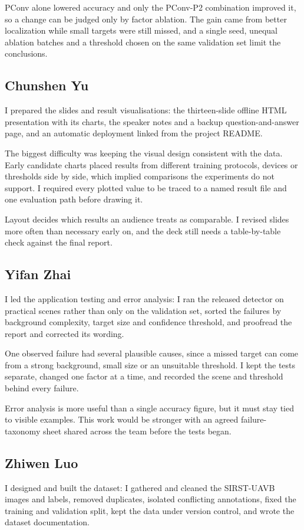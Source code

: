 \documentclass[lettersize,journal]{IEEEtran}
\begin{document}
PConv alone lowered accuracy and only the PConv-P2 combination improved it, so a change can be judged only by factor ablation. The gain came from better localization while small targets were still missed, and a single seed, unequal ablation batches and a threshold chosen on the same validation set limit the conclusions.

\subsection{Chunshen Yu}
I prepared the slides and result visualisations: the thirteen-slide offline HTML presentation with its charts, the speaker notes and a backup question-and-answer page, and an automatic deployment linked from the project README.

The biggest difficulty was keeping the visual design consistent with the data. Early candidate charts placed results from different training protocols, devices or thresholds side by side, which implied comparisons the experiments do not support. I required every plotted value to be traced to a named result file and one evaluation path before drawing it.

Layout decides which results an audience treats as comparable. I revised slides more often than necessary early on, and the deck still needs a table-by-table check against the final report.

\subsection{Yifan Zhai}
I led the application testing and error analysis: I ran the released detector on practical scenes rather than only on the validation set, sorted the failures by background complexity, target size and confidence threshold, and proofread the report and corrected its wording.

One observed failure had several plausible causes, since a missed target can come from a strong background, small size or an unsuitable threshold. I kept the tests separate, changed one factor at a time, and recorded the scene and threshold behind every failure.

Error analysis is more useful than a single accuracy figure, but it must stay tied to visible examples. This work would be stronger with an agreed failure-taxonomy sheet shared across the team before the tests began.
\subsection{Zhiwen Luo}
I designed and built the dataset: I gathered and cleaned the SIRST-UAVB images and labels, removed duplicates, isolated conflicting annotations, fixed the training and validation split, kept the data under version control, and wrote the dataset documentation.
\end{document}

